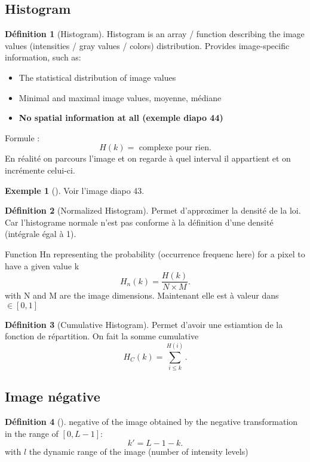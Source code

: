 \documentclass{article}
\theoremstyle{plain}%
\theoremstyle{definition}
\newtheorem{defn}{Définition}[section]
\newtheorem{exmp}{Exemple}[section]
\theoremstyle{remark}
\begin{document}
\subsection{Histogram}
\begin{defn}[Histogram]
    Histogram is an array / function describing the image values (intensities / gray values / colors) distribution. 
    Provides image-specific information, such as:
    \begin{itemize}
        \item The statistical distribution of image values
        \item Minimal and maximal image values, moyenne, médiane
        \item \textbf{No spatial information at all (exemple diapo 44)}
    \end{itemize}
    Formule : 
    \[
        H(k) = \text{ complexe pour rien}
    .\]
    En réalité on parcours l'image et on regarde à quel interval il appartient et on incrémente celui-ci.
    
    \begin{exmp}[]
        Voir l'image diapo 43.
    \end{exmp}
\end{defn}
\begin{defn}[Normalized Histogram]
    Permet d'approximer la densité de la loi. Car l'histograme normale n'est pas conforme à la définition d'une densité (intégrale égal à 1). 

    Function Hn representing the probability (occurrence frequenc here) for a pixel to have a given value k 
    \[
        H_n(k) = \frac{H(k)}{N \times M}
    .\]
    with N and M are the image dimensions. Maintenant elle est à valeur dans $ \in  [0,1] $ 
\end{defn}
\begin{defn}[Cumulative Histogram]
    Permet d'avoir une estiamtion de la fonction de répartition. On fait la somme cumulative 
    \[
        H_C(k) = \sum_{i \leq k}^{H(i)}
    .\]
\end{defn}

\subsection{Image négative}
\begin{defn}[]
    negative of the image obtained by the negative transformation in the range of $[0, L - 1]$:
    \[
        k' = L - 1 -k
    .\]
    with $ l $  the dynamic range of the image (number of intensity levels)
\end{defn}
\end{document}
